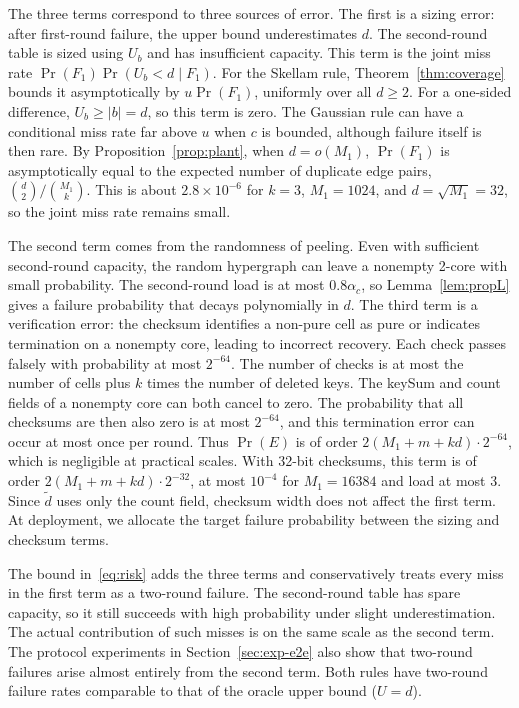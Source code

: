 The three terms correspond to three sources of error. The first is a sizing error: after first-round failure, the upper bound underestimates $d$. The second-round table is sized using $U_b$ and has insufficient capacity. This term is the joint miss rate $\Pr(F_1)\Pr(U_b<d\mid F_1)$. For the Skellam rule, Theorem~\ref{thm:coverage} bounds it asymptotically by $u\Pr(F_1)$, uniformly over all $d\ge2$. For a one-sided difference, $U_b\ge|b|=d$, so this term is zero. The Gaussian rule can have a conditional miss rate far above $u$ when $c$ is bounded, although failure itself is then rare. By Proposition~\ref{prop:plant}, when $d=o(M_1)$, $\Pr(F_1)$ is asymptotically equal to the expected number of duplicate edge pairs, $\binom d2/\binom{M_1}k$. This is about $2.8\times10^{-6}$ for $k=3$, $M_1=1024$, and $d=\sqrt{M_1}=32$, so the joint miss rate remains small.

The second term comes from the randomness of peeling. Even with sufficient second-round capacity, the random hypergraph can leave a nonempty 2-core with small probability. The second-round load is at most $0.8\alpha_c$, so Lemma~\ref{lem:propL} gives a failure probability that decays polynomially in $d$. The third term is a verification error: the checksum identifies a non-pure cell as pure or indicates termination on a nonempty core, leading to incorrect recovery. Each check passes falsely with probability at most $2^{-64}$. The number of checks is at most the number of cells plus $k$ times the number of deleted keys. The keySum and count fields of a nonempty core can both cancel to zero. The probability that all checksums are then also zero is at most $2^{-64}$, and this termination error can occur at most once per round. Thus $\Pr(E)$ is of order $2(M_1+m+kd)\cdot2^{-64}$, which is negligible at practical scales. With 32-bit checksums, this term is of order $2(M_1+m+kd)\cdot2^{-32}$, at most $10^{-4}$ for $M_1=16384$ and load at most 3. Since $\widetilde d$ uses only the count field, checksum width does not affect the first term. At deployment, we allocate the target failure probability between the sizing and checksum terms.

The bound in~\eqref{eq:risk} adds the three terms and conservatively treats every miss in the first term as a two-round failure. The second-round table has spare capacity, so it still succeeds with high probability under slight underestimation. The actual contribution of such misses is on the same scale as the second term. The protocol experiments in Section~\ref{sec:exp-e2e} also show that two-round failures arise almost entirely from the second term. Both rules have two-round failure rates comparable to that of the oracle upper bound ($U=d$).
